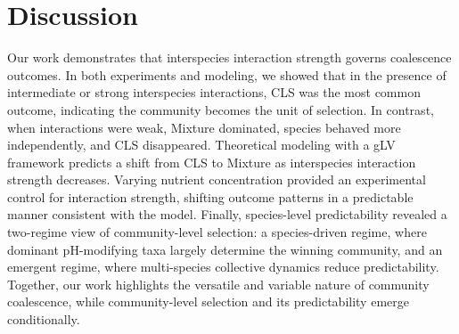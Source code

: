 \section{Discussion}
\label{sec:discussion}

Our work demonstrates that interspecies interaction strength governs coalescence outcomes. In both experiments and modeling, we showed that in the presence of intermediate or strong interspecies interactions, CLS was the most common outcome, indicating the community becomes the unit of selection. In contrast, when interactions were weak, Mixture dominated, species behaved more independently, and CLS disappeared. Theoretical modeling with a gLV framework predicts a shift from CLS to Mixture as interspecies interaction strength decreases. Varying nutrient concentration provided an experimental control for interaction strength, shifting outcome patterns in a predictable manner consistent with the model. Finally, species-level predictability revealed a two-regime view of community-level selection: a species-driven regime, where dominant pH-modifying taxa largely determine the winning community, and an emergent regime, where multi-species collective dynamics reduce predictability. Together, our work highlights the versatile and variable nature of community coalescence, while community-level selection and its predictability emerge conditionally.

